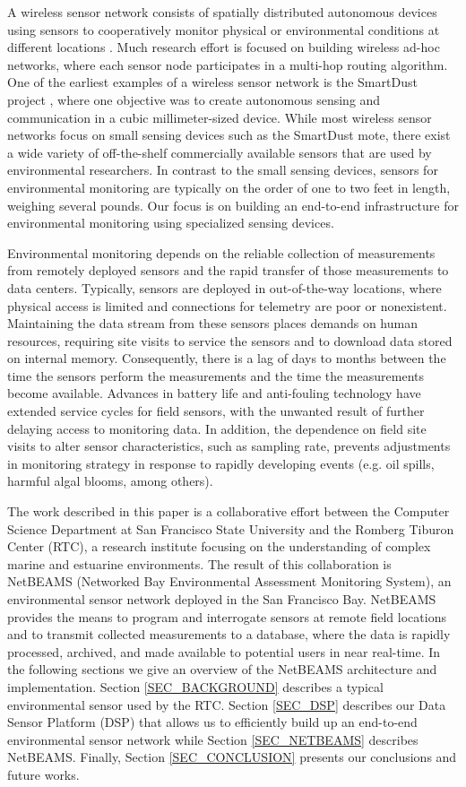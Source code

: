 \documentclass[conference]{IEEEtran}
\begin{document}
A wireless sensor network consists of spatially distributed autonomous
devices using sensors to cooperatively monitor physical or
environmental conditions at different locations \cite{roemer:2004}.
Much research effort is focused on building wireless ad-hoc networks, 
where each sensor node participates in a multi-hop routing algorithm.
One of the earliest examples of a wireless sensor network is the
SmartDust project \cite{smartdust:2001}, where one objective was to
create autonomous sensing and communication in a cubic
millimeter-sized device.  While most wireless sensor networks focus on
small sensing devices such as the SmartDust mote, there exist a wide
variety of off-the-shelf commercially available sensors that are used
by environmental researchers. In contrast to the small sensing
devices, sensors for environmental monitoring are typically on the
order of one to two feet in length, weighing several pounds. Our
focus is on building an end-to-end infrastructure for environmental
monitoring using specialized sensing devices.

Environmental monitoring depends on the reliable collection of
measurements from remotely deployed sensors and the rapid transfer of
those measurements to data centers. Typically, sensors are deployed in
out-of-the-way locations, where physical access is limited and
connections for telemetry are poor or nonexistent. Maintaining the
data stream from these sensors places demands on human resources,
requiring site visits to service the sensors and to download data
stored on internal memory.  Consequently, there is a lag of days to
months between the time the sensors perform the measurements and the
time the measurements become available. Advances in battery life and
anti-fouling technology have extended service cycles for field
sensors, with the unwanted result of further delaying access to
monitoring data.  In addition, the dependence on field site visits to
alter sensor characteristics, such as sampling rate, prevents
adjustments in monitoring strategy in response to rapidly developing
events (e.g. oil spills, harmful algal blooms, among others).

The work described in this paper is a collaborative effort between the
Computer Science Department at San Francisco State University and the
Romberg Tiburon Center (RTC), a research institute focusing on the
understanding of complex marine and estuarine environments. The result
of this collaboration is NetBEAMS (Networked Bay Environmental
Assessment Monitoring System), an environmental sensor network
deployed in the San Francisco Bay. NetBEAMS provides the means to program
and interrogate sensors at remote field locations and to transmit
collected measurements to a database, where the data is rapidly
processed, archived, and made available to potential users in near
real-time. In the following sections we give an overview of the NetBEAMS
architecture and implementation.  Section \ref{SEC_BACKGROUND}
describes a typical environmental sensor used by the RTC. Section
\ref{SEC_DSP} describes our Data Sensor Platform (DSP) that allows us
to efficiently build up an end-to-end environmental sensor network while
Section \ref{SEC_NETBEAMS} describes NetBEAMS. Finally, Section 
\ref{SEC_CONCLUSION} presents our conclusions and future works.
\end{document}

